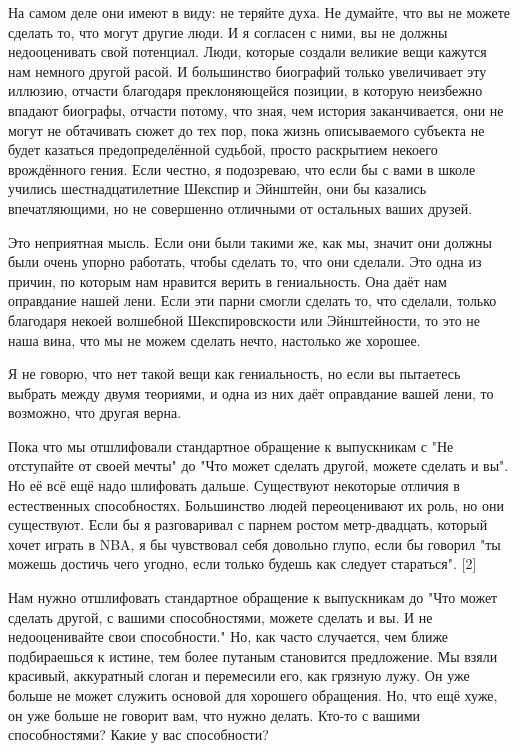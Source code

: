 \documentclass[ebook,12pt,oneside,openany]{memoir}
\begin{document}
На самом деле они имеют в виду: не теряйте духа. Не думайте, что вы не
можете сделать то, что могут другие люди. И я согласен с ними, вы не
должны недооценивать свой потенциал. Люди, которые создали великие
вещи кажутся нам немного другой расой. И большинство биографий только
увеличивает эту иллюзию, отчасти благодаря преклоняющейся позиции, в
которую неизбежно впадают биографы, отчасти потому, что зная, чем
история заканчивается, они не могут не обтачивать сюжет до тех пор,
пока жизнь описываемого субъекта не будет казаться предопределённой
судьбой, просто раскрытием некоего врождённого гения. Если честно, я
подозреваю, что если бы с вами в школе учились шестнадцатилетние
Шекспир и Эйнштейн, они бы казались впечатляющими, но не совершенно
отличными от остальных ваших друзей.

Это неприятная мысль. Если они были такими же, как мы, значит они
должны были очень упорно работать, чтобы сделать то, что они сделали.
Это одна из причин, по которым нам нравится верить в гениальность. Она
даёт нам оправдание нашей лени. Если эти парни смогли сделать то, что
сделали, только благодаря некоей волшебной Шекспировскости или
Эйнштейности, то это не наша вина, что мы не можем сделать нечто,
настолько же хорошее.

Я не говорю, что нет такой вещи как гениальность, но если вы пытаетесь
выбрать между двумя теориями, и одна из них даёт оправдание вашей
лени, то возможно, что другая верна.

Пока что мы отшлифовали стандартное обращение к выпускникам с "Не
отступайте от своей мечты" до "Что может сделать другой, можете
сделать и вы". Но её всё ещё надо шлифовать дальше. Существуют
некоторые отличия в естественных способностях. Большинство людей
переоценивают их роль, но они существуют. Если бы я разговаривал с
парнем ростом метр-двадцать, который хочет играть в NBA, я бы
чувствовал себя довольно глупо, если бы говорил "ты можешь достичь
чего угодно, если только будешь как следует стараться". [2]

Нам нужно отшлифовать стандартное обращение к выпускникам до "Что
может сделать другой, с вашими способностями, можете сделать и вы. И
не недооценивайте свои способности." Но, как часто случается, чем
ближе подбираешься к истине, тем более путаным становится предложение.
Мы взяли красивый, аккуратный слоган и перемесили его, как грязную
лужу. Он уже больше не может служить основой для хорошего обращения.
Но, что ещё хуже, он уже больше не говорит вам, что нужно делать.
Кто-то с вашими способностями? Какие у вас способности?
\end{document}
